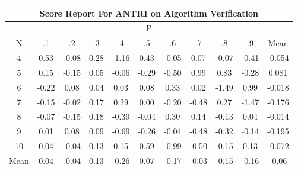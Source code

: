 \documentclass[11pt,a4paper]{report}
\begin{document}
\begin{longtable}{ | c || c | c | c | c | c | c | c | c | c || c |}
\hline
\multicolumn{11}{|c|}{ Score Report For ANTRI on Algorithm Verification} \\
\hline
\multicolumn{11}{|c|}{ P } \\
\hline
N & .1 & .2 & .3 & .4 & .5 & .6 & .7 & .8 & .9 & Mean\\
 \hline
 \hline
 \endhead
  4 &  \cellcolor[HTML]{EFEFFF} 0.53 &  \cellcolor[HTML]{FFFFFF} -0.08 &  \cellcolor[HTML]{F7F7FF} 0.28 &  \cellcolor[HTML]{FFDFDF} -1.16 &  \cellcolor[HTML]{F7F7FF} 0.43 &  \cellcolor[HTML]{FFFFFF} -0.05 &  \cellcolor[HTML]{FFFFFF} 0.07 &  \cellcolor[HTML]{FFFFFF} -0.07 &  \cellcolor[HTML]{FFF7F7} -0.41 & -0.054 \\
  5 &  \cellcolor[HTML]{FFFFFF} 0.15 &  \cellcolor[HTML]{FFFFFF} -0.15 &  \cellcolor[HTML]{FFFFFF} 0.05 &  \cellcolor[HTML]{FFFFFF} -0.06 &  \cellcolor[HTML]{FFF7F7} -0.29 &  \cellcolor[HTML]{FFEFEF} -0.50 &  \cellcolor[HTML]{E7E7FF} 0.99 &  \cellcolor[HTML]{E7E7FF} 0.83 &  \cellcolor[HTML]{FFF7F7} -0.28 & 0.081 \\
  6 &  \cellcolor[HTML]{FFF7F7} -0.22 &  \cellcolor[HTML]{FFFFFF} 0.08 &  \cellcolor[HTML]{FFFFFF} 0.04 &  \cellcolor[HTML]{FFFFFF} 0.03 &  \cellcolor[HTML]{FFFFFF} 0.08 &  \cellcolor[HTML]{F7F7FF} 0.33 &  \cellcolor[HTML]{FFFFFF} 0.02 &  \cellcolor[HTML]{FFD7D7} -1.49 &  \cellcolor[HTML]{E7E7FF} 0.99 & -0.018 \\
  7 &  \cellcolor[HTML]{FFFFFF} -0.15 &  \cellcolor[HTML]{FFFFFF} -0.02 &  \cellcolor[HTML]{F7F7FF} 0.17 &  \cellcolor[HTML]{F7F7FF} 0.29 &  \cellcolor[HTML]{FFFFFF} 0.00 &  \cellcolor[HTML]{FFF7F7} -0.20 &  \cellcolor[HTML]{FFEFEF} -0.48 &  \cellcolor[HTML]{F7F7FF} 0.27 &  \cellcolor[HTML]{FFD7D7} -1.47 & -0.176 \\
  8 &  \cellcolor[HTML]{FFFFFF} -0.07 &  \cellcolor[HTML]{FFFFFF} -0.15 &  \cellcolor[HTML]{F7F7FF} 0.18 &  \cellcolor[HTML]{FFF7F7} -0.39 &  \cellcolor[HTML]{FFFFFF} -0.04 &  \cellcolor[HTML]{F7F7FF} 0.30 &  \cellcolor[HTML]{FFFFFF} 0.14 &  \cellcolor[HTML]{FFFFFF} -0.13 &  \cellcolor[HTML]{FFFFFF} 0.04 & -0.014 \\
  9 &  \cellcolor[HTML]{FFFFFF} 0.01 &  \cellcolor[HTML]{FFFFFF} 0.08 &  \cellcolor[HTML]{FFFFFF} 0.09 &  \cellcolor[HTML]{FFEFEF} -0.69 &  \cellcolor[HTML]{FFF7F7} -0.26 &  \cellcolor[HTML]{FFFFFF} -0.04 &  \cellcolor[HTML]{FFEFEF} -0.48 &  \cellcolor[HTML]{FFF7F7} -0.32 &  \cellcolor[HTML]{FFFFFF} -0.14 & -0.195 \\
  10 &  \cellcolor[HTML]{FFFFFF} 0.04 &  \cellcolor[HTML]{FFFFFF} -0.04 &  \cellcolor[HTML]{FFFFFF} 0.13 &  \cellcolor[HTML]{FFFFFF} 0.15 &  \cellcolor[HTML]{EFEFFF} 0.59 &  \cellcolor[HTML]{FFE7E7} -0.99 &  \cellcolor[HTML]{FFEFEF} -0.50 &  \cellcolor[HTML]{FFFFFF} -0.15 &  \cellcolor[HTML]{FFFFFF} 0.13 & -0.072 \\
 \hline
 \hline
Mean &  \cellcolor[HTML]{FFFFFF} 0.04 &  \cellcolor[HTML]{FFFFFF} -0.04 &  \cellcolor[HTML]{FFFFFF} 0.13 &  \cellcolor[HTML]{FFF7F7} -0.26 &  \cellcolor[HTML]{FFFFFF} 0.07 &  \cellcolor[HTML]{FFF7F7} -0.17 &  \cellcolor[HTML]{FFFFFF} -0.03 &  \cellcolor[HTML]{FFFFFF} -0.15 &  \cellcolor[HTML]{FFF7F7} -0.16 &  \cellcolor[HTML]{FFFFFF} -0.06
\end{longtable}
\end{document}
